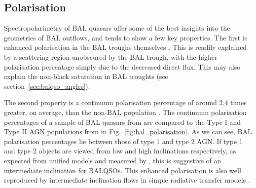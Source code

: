 

\subsection{Polarisation}

Spectropolarimetry of BAL quasars offer some of
the best insights into the geometries of BAL outflows, and 
tends to show a few key properties. The first is enhanced 
polarisation in the BAL troughs themselves \citep{schmidt1999}. 
This is readily explained by a scattering region unobscured by the
BAL trough, with the higher polarisation percentage simply due to the
decreased direct flux. This may also explain the non-black saturation in
BAL troughts (see section~\ref{sec:balqso_angles}).

The second property 
is a continuum polarisation percentage of around $2.4$ times greater, 
on average, than the non-BAL population \citep{schmidt1999}.
The continuum polarisation percentages of a sample of BAL quasars from 
\cite{schmidt1999} are compared to the Type I and Type II AGN 
populations from \cite{marin2014} in Fig.~\ref{fig:bal_polarisation}.
As we can see, BAL polarisation percentages lie between those of type 1
and type 2 AGN. If type 1 and type 2 objects are viewed from low and high 
inclinations respectively, as expected from unified models and measured by
\cite{marin2014,marin2016}, this is suggestive of an intermediate inclination
for BALQSOs. This enhanced polarisation is also well reproduced by intermediate
inclination flows in simple radiative transfer models \citep{marin2013}.

